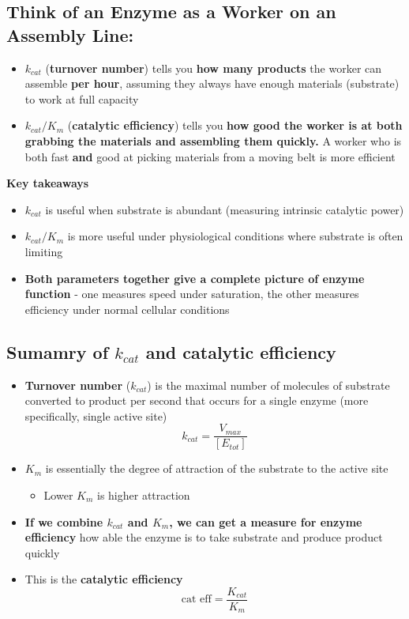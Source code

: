 \documentclass[10pt]{article}
\begin{document}
\subsection*{Think of an Enzyme as a Worker on an Assembly Line:}
\begin{itemize}
    \item $k_{cat}$ (\textbf{turnover number}) tells you \textbf{how many products} the worker can assemble \textbf{per hour}, assuming they always have enough materials (substrate) to work at full capacity
    \item $k_{cat} / K_m$ (\textbf{catalytic efficiency}) tells you \textbf{how good the worker is at both grabbing the materials and assembling them quickly.}  A worker who is both fast \textbf{and} good at picking materials from a moving belt is more efficient
\end{itemize}
\textbf{Key takeaways}
\begin{itemize}
    \item $k_{cat}$ is useful when substrate is abundant (measuring intrinsic catalytic power)
    \item $k_{cat} / K_m$ is more useful under physiological conditions where substrate is often limiting
    \item \textbf{Both parameters together give a complete picture of enzyme function} - one measures speed under saturation, the other measures efficiency under normal cellular conditions
\end{itemize}

\subsection*{Sumamry of $k_{cat}$ and catalytic efficiency}
\begin{itemize}
    \item \textbf{Turnover number} ($k_{cat}$) is the maximal number of molecules of substrate converted to product per second that occurs for a single enzyme (more specifically, single active site)
    \[k_{cat} = \frac{V_{max}}{[E_{tot}]}\]
    \item $K_m$ is essentially the degree of attraction of the substrate to the active site
    \begin{itemize}
        \item Lower $K_m$ is higher attraction
    \end{itemize}
    \item \textbf{If we combine $k_{cat}$ and $K_m$, we can get a measure for enzyme efficiency} how able the enzyme is to take substrate and produce product quickly
    \item This is the \textbf{catalytic efficiency}
    \[\text{cat eff} = \frac{K_{cat}}{K_m}\]
\end{itemize}
\end{document}
